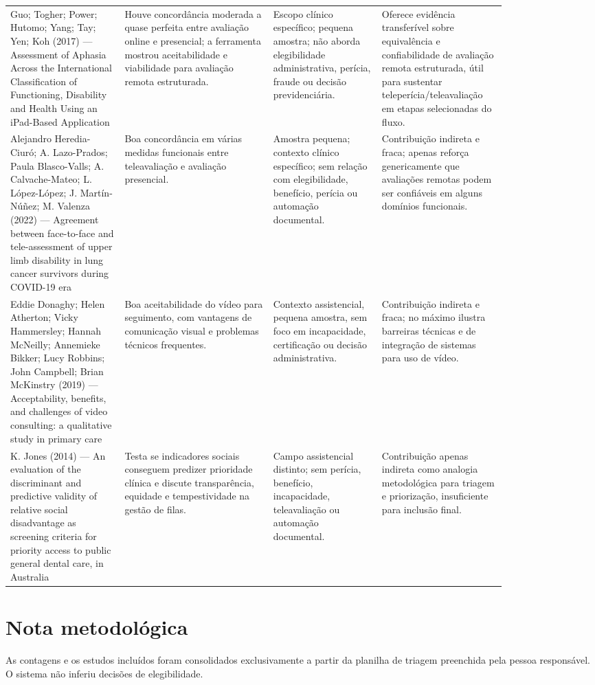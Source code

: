 \documentclass[12pt,a4paper]{article}
\begin{document}
\begin{landscape}
\begin{longtable}{p{0.20\linewidth}p{0.26\linewidth}p{0.19\linewidth}p{0.19\linewidth}}
Guo; Togher; Power; Hutomo; Yang; Tay; Yen; Koh (2017) — Assessment of Aphasia Across the International Classification of Functioning, Disability and Health Using an iPad-Based Application & Houve concordância moderada a quase perfeita entre avaliação online e presencial; a ferramenta mostrou aceitabilidade e viabilidade para avaliação remota estruturada. & Escopo clínico específico; pequena amostra; não aborda elegibilidade administrativa, perícia, fraude ou decisão previdenciária. & Oferece evidência transferível sobre equivalência e confiabilidade de avaliação remota estruturada, útil para sustentar teleperícia/teleavaliação em etapas selecionadas do fluxo.\\
Alejandro Heredia-Ciuró; A. Lazo-Prados; Paula Blasco-Valls; A. Calvache-Mateo; L. López-López; J. Martín-Núñez; M. Valenza (2022) — Agreement between face-to-face and tele-assessment of upper limb disability in lung cancer survivors during COVID-19 era & Boa concordância em várias medidas funcionais entre teleavaliação e avaliação presencial. & Amostra pequena; contexto clínico específico; sem relação com elegibilidade, benefício, perícia ou automação documental. & Contribuição indireta e fraca; apenas reforça genericamente que avaliações remotas podem ser confiáveis em alguns domínios funcionais.\\
Eddie Donaghy; Helen Atherton; Vicky Hammersley; Hannah McNeilly; Annemieke Bikker; Lucy Robbins; John Campbell; Brian McKinstry (2019) — Acceptability, benefits, and challenges of video consulting: a qualitative study in primary care & Boa aceitabilidade do vídeo para seguimento, com vantagens de comunicação visual e problemas técnicos frequentes. & Contexto assistencial, pequena amostra, sem foco em incapacidade, certificação ou decisão administrativa. & Contribuição indireta e fraca; no máximo ilustra barreiras técnicas e de integração de sistemas para uso de vídeo.\\
K. Jones (2014) — An evaluation of the discriminant and predictive validity of relative social disadvantage as screening criteria for priority access to public general dental care, in Australia & Testa se indicadores sociais conseguem predizer prioridade clínica e discute transparência, equidade e tempestividade na gestão de filas. & Campo assistencial distinto; sem perícia, benefício, incapacidade, teleavaliação ou automação documental. & Contribuição apenas indireta como analogia metodológica para triagem e priorização, insuficiente para inclusão final.\\
\end{longtable}
\normalsize
\end{landscape}

\section{Nota metodológica}
\label{sec:orgca687d1}
As contagens e os estudos incluídos foram consolidados exclusivamente a partir da planilha de triagem preenchida pela pessoa responsável. O sistema não inferiu decisões de elegibilidade.
\end{document}
